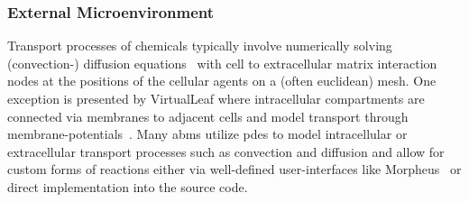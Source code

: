 \subsubsection*{External Microenvironment}
\label{subsec:abms-intra-extra-cellular-reactions-secretion}\noindent
Transport processes of chemicals typically involve numerically solving (convection-)
diffusion
equations~\cite{Alberts2002,Chandrasekhar1943}
with cell to extracellular matrix interaction nodes at the positions of the cellular
agents on a (often euclidean) mesh.
One exception is presented by VirtualLeaf where intracellular compartments are connected
via membranes to adjacent cells and model transport through membrane-potentials~\cite{Merks2011}.
Many \acp{abm} utilize \acp{pde} to model intracellular or extracellular transport
processes such as convection and diffusion and allow for custom forms of reactions either
via well-defined user-interfaces like
Morpheus~\cite{Starruss2014} or direct implementation into
the source code.

%
%
